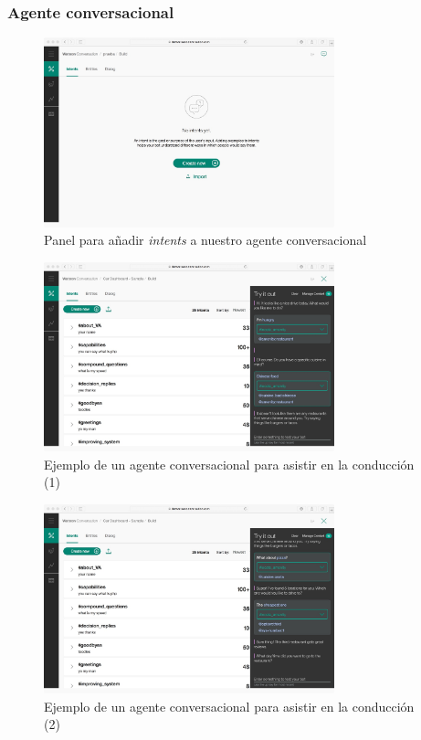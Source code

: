 \documentclass[paper=a4, fontsize=10pt]{scrartcl} %
\numberwithin{equation}{section} %
\numberwithin{figure}{section} %
\numberwithin{table}{section} %
\begin{document}
\subsubsection{Agente conversacional}

\begin{figure}[H]
			\centering
			\label{panel.jpg}
			\includegraphics[width=0.75\textwidth]{./Imagenes/panel.jpeg}
			\caption{Panel para añadir \textit{intents} a nuestro agente conversacional}
\end{figure}

\begin{figure}[H]
			\centering
			\label{car1.jpg}
			\includegraphics[width=0.75\textwidth]{./Imagenes/car1.jpeg}
			\caption{Ejemplo de un agente conversacional para asistir en la conducción (1)}
\end{figure}

\begin{figure}[H]
			\centering
			\label{car1.jpg}
			\includegraphics[width=0.75\textwidth]{./Imagenes/car2.jpeg}
			\caption{Ejemplo de un agente conversacional para asistir en la conducción (2)}
\end{figure}
\end{document}
